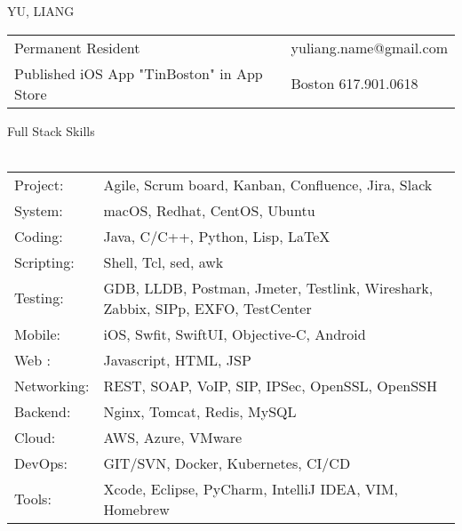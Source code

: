 \documentclass[10pt]{article}
\newcommand{\lineunder}{\vspace*{-8pt}\\\hspace*{-18pt}\hrulefill\\}
\newcommand{\header}[1]{{\hspace*{-15pt}\vspace*{6pt}\large{{#1}}}\vspace*{-6pt}\lineunder}
\begin{document}
\pagestyle{CVfooter}

\vspace*{-40pt}
\begin{center}
{\LARGE \scshape {YU, LIANG}}
\end{center}



\begin{center}

\begin{tabular}{l l}
\small{Permanent Resident}    & \small{yuliang.name@gmail.com} \\
\small{Published iOS App "TinBoston" in App Store}         & \small{Boston 617.901.0618} \\
\end{tabular}

\end{center}



\header{Full Stack Skills}

\begin{tabular}{l l}

Project: & Agile, Scrum board, Kanban, Confluence, Jira, Slack \\
System: & macOS, Redhat, CentOS, Ubuntu \\
Coding: & Java, C/C++, Python, Lisp, \LaTeX \\
Scripting: & Shell, Tcl, sed, awk \\
Testing: & GDB, LLDB, Postman, Jmeter, Testlink, Wireshark, Zabbix, SIPp, EXFO, TestCenter \\
Mobile: & iOS, Swfit, SwiftUI, Objective-C, Android \\
Web : & Javascript, HTML, JSP \\
Networking: & REST, SOAP, VoIP, SIP, IPSec, OpenSSL, OpenSSH \\
Backend: & Nginx, Tomcat, Redis, MySQL \\
Cloud: & AWS, Azure, VMware \\
DevOps: & GIT/SVN, Docker, Kubernetes, CI/CD \\
Tools: & Xcode, Eclipse, PyCharm, IntelliJ IDEA, VIM, Homebrew \\

\end{tabular}
\vspace*{10pt}
\end{document}
